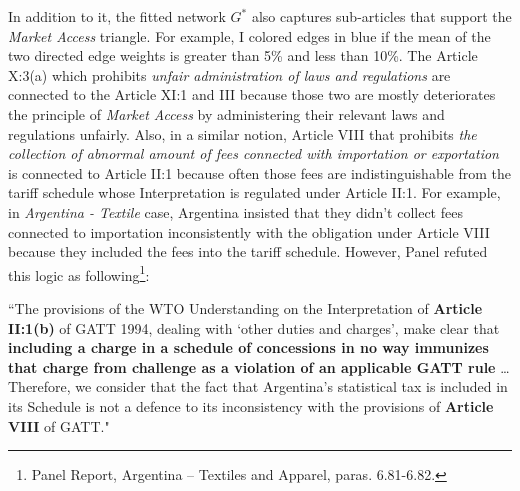  In addition to it,
 the fitted network $G^*$ also captures sub-articles that support the \textit{Market Access} triangle. For example, I colored edges in blue if the mean of the two directed edge weights is greater than 5\% and less than 10\%.
 The Article X:3(a) which prohibits \textit{unfair administration of laws and regulations} are connected to the Article XI:1 and III because those two are mostly
 deteriorates the principle of \textit{Market Access} by administering their relevant laws and regulations unfairly. Also, in a similar notion, Article VIII that prohibits \textit{the collection of abnormal amount of fees connected with importation or exportation} is connected to Article II:1 because
 often those fees are indistinguishable from the tariff schedule whose Interpretation is regulated under Article II:1. For example, in \textit{Argentina - Textile} case, Argentina insisted that they didn't collect fees connected to importation inconsistently with the obligation under Article VIII because they included the fees into the tariff schedule. %
 However, Panel refuted this logic as following\footnote{Panel Report, Argentina – Textiles and Apparel, paras. 6.81-6.82.}:
  
 \begin{displayquote}[][]
 ``The provisions of the WTO Understanding on the Interpretation of \textbf{Article II:1(b)} of
 GATT 1994, dealing with `other duties and charges’, make clear that \textbf{including a
 charge in a schedule of concessions in no way immunizes that charge from challenge
 as a violation of an applicable GATT rule} \ldots Therefore, we consider that the fact that Argentina's statistical tax is included in its
 Schedule is not a defence to its inconsistency with the provisions of \textbf{Article VIII} of
 GATT."
 \end{displayquote}
  
  
  
  
  
  
  
  
  
 
 
